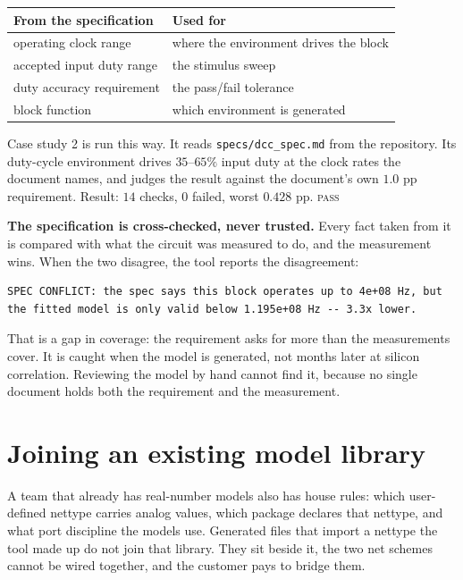 \documentclass[11pt,a4paper]{article}
\newcommand{\pass}{\textcolor{pass}{\textsc{pass}}}
\begin{document}
\begin{center}
\begin{tabular}{@{}ll@{}}
\toprule
\textbf{From the specification} & \textbf{Used for} \\
\midrule
operating clock range          & where the environment drives the block \\
accepted input duty range      & the stimulus sweep \\
duty accuracy requirement      & the pass/fail tolerance \\
block function                 & which environment is generated \\
\bottomrule
\end{tabular}
\end{center}

\noindent Case study 2 is run this way. It reads
\texttt{specs/dcc\_spec.md} from the repository. Its duty-cycle
environment drives $35$--$65\%$ input duty at the clock rates the
document names, and judges the result against the document's own
$1.0$ pp requirement. Result: $14$ checks, $0$ failed, worst
$0.428$ pp. \pass

\textbf{The specification is cross-checked, never trusted.} Every
fact taken from it is compared with what the circuit was measured to
do, and the measurement wins. When the two disagree, the tool reports
the disagreement:

\begin{lstlisting}
SPEC CONFLICT: the spec says this block operates up to 4e+08 Hz, but
the fitted model is only valid below 1.195e+08 Hz -- 3.3x lower.
\end{lstlisting}

\noindent That is a gap in coverage: the requirement asks for more
than the measurements cover. It is caught when the model is generated,
not months later at silicon correlation. Reviewing the model by hand
cannot find it, because no single document holds both the requirement
and the measurement.

\section{Joining an existing model library}
\label{sec:style}

A team that already has real-number models also has house rules:
which user-defined nettype carries analog values, which package
declares that nettype, and what port discipline the models use.
Generated files that import a nettype the tool made up do not join
that library. They sit beside it, the two net schemes cannot be wired
together, and the customer pays to bridge them.
\end{document}
